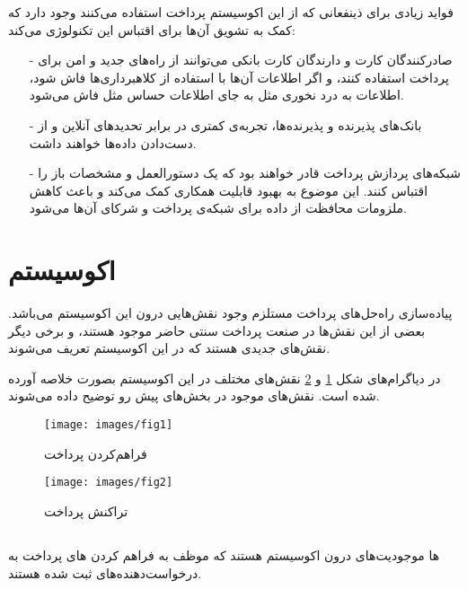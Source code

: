 \documentclass[oneside]{report}
\begin{document}
فواید زیادی برای ذینفعانی که از این اکوسیستم پرداخت استفاده می‌کنند وجود دارد که کمک به تشویق آن‌ها برای اقتباس این تکنولوژی می‌کند:
\begin{itemize}
	\item[-] 
	صادرکنندگان کارت و دارندگان کارت بانکی می‌توانند از راه‌های جدید و امن برای پرداخت استفاده کنند، و اگر اطلاعات آن‌ها با استفاده از کلاهبرداری‌ها فاش شود، اطلاعات به درد نخوری مثل 
	{\normalsize  {}}
	به جای اطلاعات حساس مثل 
	{\normalsize  {}}
	فاش می‌شود. 
	\item[-]
	بانک‌های پذیرنده و پذیرنده‌ها، تجربه‌ی کمتری در برابر تحدیدهای آنلاین و از دست‌دادن داده‌ها خواهند داشت.
	\item[-] 
	شبکه‌های پردازش پرداخت قادر خواهند بود که یک دستورالعمل و مشخصات باز را اقتباس کنند. این موضوع به  بهبود قابلیت همکاری کمک می‌کند و باعث کاهش ملزومات محافظت از داده برای شبکه‌ی پرداخت و شرکای آن‌ها می‌شود. 
\end{itemize}

\section{اکوسیستم {\large  {}}}					
پیاده‌سازی راه‌حل‌های 
{\large  {}}
پرداخت مستلزم وجود نقش‌هایی درون این اکوسیستم می‌باشد. بعضی از این نقش‌ها در صنعت پرداخت سنتی حاضر موجود هستند، و برخی دیگر نقش‌های جدیدی هستند که در این اکوسیستم تعریف می‌شوند. 

در دیاگرام‌های شکل 
\ref{fig:fig1}
و 
\ref{fig:fig2}
 نقش‌های مختلف در این اکوسیستم  بصورت خلاصه آورده شده است. نقش‌های موجود در بخش‌های پیش رو توضیح داده می‌شوند.

\begin{figure}
	\centering
	\texttt{[image: images/fig1]}
	\caption{فراهم‌کردن{\footnotesize  {}} پرداخت }
	\label{fig:fig1}
\end{figure}

\begin{figure}
	\centering
	\texttt{[image: images/fig2]}
	\caption{تراکنش {\footnotesize  {}} پرداخت}
	\label{fig:fig2}
\end{figure}
\newpage
\subsection{{\normalsize {}}}
		{\normalsize  {}}ها 
		موجودیت‌های درون اکوسیستم
		{\normalsize  {}}
		هستند که موظف به فراهم کردن 
		{\normalsize  {}}های
		پرداخت به درخواست‌دهنده‌های 
		{\normalsize  {}}
		ثبت شده هستند. 
 
\end{document}
